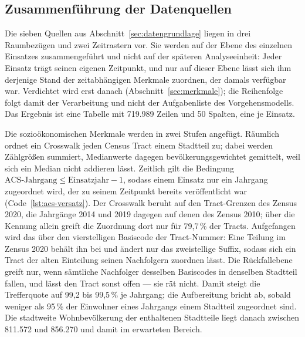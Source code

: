\documentclass[12pt,a4paper]{article}
\begin{document}
\subsection{Zusammenführung der Datenquellen}
\label{sec:integration}

Die sieben Quellen aus Abschnitt~\ref{sec:datengrundlage} liegen in drei
Raumbezügen und zwei Zeitrastern vor. Sie werden auf der Ebene des einzelnen
Einsatzes zusammengeführt und nicht auf der späteren Analyseeinheit: Jeder
Einsatz trägt seinen eigenen Zeitpunkt, und nur auf dieser Ebene lässt sich ihm
derjenige Stand der zeitabhängigen Merkmale zuordnen, der damals verfügbar war.
Verdichtet wird erst danach (Abschnitt~\ref{sec:merkmale}); die Reihenfolge
folgt damit der Verarbeitung und nicht der Aufgabenliste des Vorgehensmodells.
Das Ergebnis ist eine Tabelle mit 719.989 Zeilen und 50 Spalten, eine je
Einsatz.
 
Die sozioökonomischen Merkmale werden in zwei Stufen angefügt. Räumlich ordnet
ein Crosswalk jeden Census Tract einem Stadtteil zu; dabei werden Zählgrößen
summiert, Medianwerte dagegen bevölkerungsgewichtet gemittelt, weil sich ein
Median nicht addieren lässt. Zeitlich gilt die Bedingung
$\text{ACS-Jahrgang} \le \text{Einsatzjahr} - 1$, sodass einem Einsatz nur ein
Jahrgang zugeordnet wird, der zu seinem Zeitpunkt bereits veröffentlicht war
(Code~\ref{lst:acs-versatz}). Der Crosswalk beruht auf den Tract-Grenzen
des Zensus 2020, die Jahrgänge 2014 und 2019 dagegen auf denen des Zensus 2010;
über die Kennung allein greift die Zuordnung dort nur für 79,7\,\% der Tracts.
Aufgefangen wird das über den vierstelligen Basiscode der Tract-Nummer: Eine
Teilung im Zensus 2020 behält ihn bei und ändert nur das zweistellige Suffix,
sodass sich ein Tract der alten Einteilung seinen Nachfolgern zuordnen lässt.
Die Rückfallebene greift nur, wenn sämtliche Nachfolger desselben Basiscodes in
denselben Stadtteil fallen, und lässt den Tract sonst offen --- sie rät nicht.
Damit steigt die Trefferquote auf 99,2 bis 99,5\,\% je Jahrgang; die
Aufbereitung bricht ab, sobald weniger als 95\,\% der Einwohner eines Jahrgangs
einem Stadtteil zugeordnet sind. Die stadtweite Wohnbevölkerung der enthaltenen
Stadtteile liegt danach zwischen 811.572 und 856.270 und damit im erwarteten
Bereich.
\end{document}
